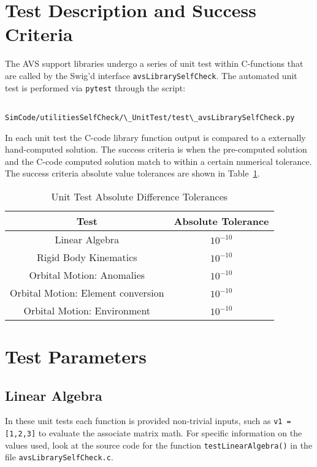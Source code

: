 
\section{Test Description and Success Criteria}
The AVS support libraries undergo a series of unit test within C-functions that are called by the Swig'd interface {\tt avsLibrarySelfCheck}.  The automated unit test is performed via {\tt pytest} through the script:
\begin{verbatim}
     SimCode/utilitiesSelfCheck/\_UnitTest/test\_avsLibrarySelfCheck.py
\end{verbatim}
In each unit test the C-code library function output is compared to a externally hand-computed solution.  The success criteria is when the pre-computed solution and the C-code computed solution match to within a certain numerical tolerance.  The success criteria absolute value tolerances are shown in Table~\ref{tbl:tolerance}.



\begin{table}[htbp]
	\caption{Unit Test Absolute Difference Tolerances}
	\label{tbl:tolerance}
	\centering \fontsize{10}{10}\selectfont
	\begin{tabular}{c | c} %
		\hline 
		\hline 
		Test    & Absolute Tolerance \\
		\hline 
		  Linear Algebra    & $10^{-10}$ \\
		  Rigid Body Kinematics    & $10^{-10}$ \\
		  Orbital Motion: Anomalies    & $10^{-10}$ \\
		  Orbital Motion: Element conversion    & $10^{-10}$ \\
		  Orbital Motion: Environment    & $10^{-10}$ \\
		\hline
		\hline
	\end{tabular}
\end{table}





\section{Test Parameters}

\subsection{Linear Algebra}
In these unit tests each function is provided non-trivial inputs, such as {\tt v1 = [1,2,3]} to evaluate the associate matrix math.  For specific information on the values used, look at the source code for the function {\tt testLinearAlgebra()} in the file {\tt avsLibrarySelfCheck.c}.  

